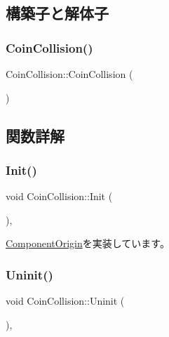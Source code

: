 \subsection{構築子と解体子}
\mbox{\label{class_coin_collision_a30288ed12410957ccf72f26da10de856}} 
\subsubsection{\texorpdfstring{Coin\+Collision()}{CoinCollision()}}
{\footnotesize\ttfamily Coin\+Collision\+::\+Coin\+Collision (\begin{DoxyParamCaption}{ }\end{DoxyParamCaption})}



\subsection{関数詳解}
\mbox{\label{class_coin_collision_a4119a7decab2410a4ada3568ad0c132d}} 
\subsubsection{\texorpdfstring{Init()}{Init()}}
{\footnotesize\ttfamily void Coin\+Collision\+::\+Init (\begin{DoxyParamCaption}{ }\end{DoxyParamCaption})\hspace{0.3cm}{\ttfamily [override]}, {\ttfamily [virtual]}}



\mbox{\hyperlink{class_component_origin_a9f674891257f2272b1636d8b6bb05d81}{Component\+Origin}}を実装しています。

\mbox{\label{class_coin_collision_aa852afdcdbedcf82809df9c7fd99be9e}} 
\subsubsection{\texorpdfstring{Uninit()}{Uninit()}}
{\footnotesize\ttfamily void Coin\+Collision\+::\+Uninit (\begin{DoxyParamCaption}{ }\end{DoxyParamCaption})\hspace{0.3cm}{\ttfamily [override]}, {\ttfamily [virtual]}}



